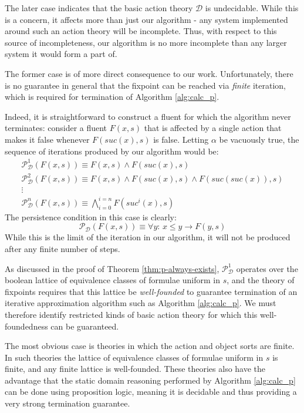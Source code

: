 The later case indicates that the basic action theory $\mathcal{D}$
is undecidable. While this is a concern, it affects more than just
our algorithm - any system implemented around such an action theory
will be incomplete. Thus, with respect to this source of incompleteness,
our algorithm is no more incomplete than any larger system it would
form a part of.

The former case is of more direct consequence to our work. Unfortunately,
there is no guarantee in general that the fixpoint can be reached
via \emph{finite} iteration, which is required for termination of
Algorithm \ref{alg:calc_p}.

Indeed, it is straightforward to construct a fluent for which the
algorithm never terminates: consider a fluent $F(x,s)$ that is affected
by a single action that makes it false whenever $F(suc(x),s)$ is
false. Letting $\alpha$ be vacuously true, the sequence of iterations
produced by our algorithm would be:\begin{gather*}
\mathcal{P}_{\mathcal{D}}^{1}(F(x,s))\equiv F(x,s)\wedge F(suc(x),s)\\
\mathcal{P}_{\mathcal{D}}^{2}(F(x,s))\equiv F(x,s)\wedge F(suc(x),s)\wedge F(suc(suc(x)),s)\\
\vdots\\
\mathcal{P}_{\mathcal{D}}^{n}(F(x,s))\equiv\bigwedge_{i=0}^{i=n}F(suc^{i}(x),s)\end{gather*}
 The persistence condition in this case is clearly: \[
\mathcal{P}_{\mathcal{D}}(F(x,s))\equiv\forall y:\, x\leq y\rightarrow F(y,s)\]
 While this is the limit of the iteration in our algorithm, it will
not be produced after any finite number of steps.

As discussed in the proof of Theorem \ref{thm:p-always-exists}, $\mathcal{P}_{\mathcal{D}}^{1}$
operates over the boolean lattice of equivalence classes of formulae
uniform in $s$, and the theory of fixpoints requires that this lattice
be \emph{well-founded} to guarantee termination of an iterative approximation
algorithm such as Algorithm \ref{alg:calc_p}. We must therefore identify
restricted kinds of basic action theory for which this well-foundedness
can be guaranteed.

The most obvious case is theories in which the action and object sorts
are finite. In such theories the lattice of equivalence classes of
formulae uniform in $s$ is finite, and any finite lattice is well-founded.
These theories also have the advantage that the static domain reasoning
performed by Algorithm \ref{alg:calc_p} can be done using proposition
logic, meaning it is decidable and thus providing a very strong termination
guarantee.

